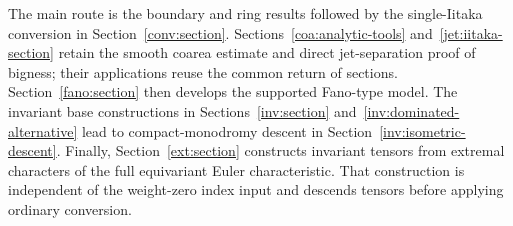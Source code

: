 The main route is the boundary and ring results followed by the
single-Iitaka conversion in Section~\ref{conv:section}.
Sections~\ref{coa:analytic-tools} and~\ref{jet:iitaka-section}
retain the smooth coarea estimate and direct jet-separation proof
of bigness; their applications reuse the common return of sections.
Section~\ref{fano:section} then develops the supported Fano-type
model.  The invariant base constructions in Sections~\ref{inv:section}
and~\ref{inv:dominated-alternative} lead to compact-monodromy descent
in Section~\ref{inv:isometric-descent}.
Finally, Section~\ref{ext:section} constructs invariant tensors from
extremal characters of the full equivariant Euler characteristic.
That construction is independent of the weight-zero index input and
descends tensors before applying ordinary conversion.
